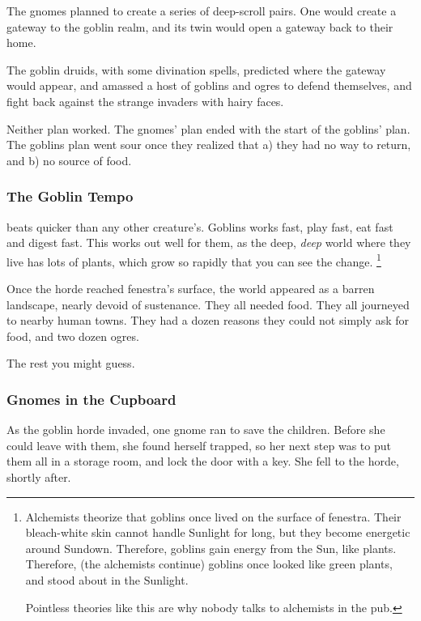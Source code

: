 \begin{multicols}{2}
\begin{exampletext}
  The gnomes planned to create a series of \gls{deep}-scroll pairs.
  One would create a gateway to the goblin realm, and its twin would open a gateway back to their home.

  The goblin druids, with some divination spells, predicted where the gateway would appear, and amassed a host of goblins and ogres to defend themselves, and fight back against the strange invaders with hairy faces. 

  Neither plan worked.
  The gnomes' plan ended with the start of the goblins' plan.
  The goblins plan went sour once they realized that a) they had no way to return, and b) no source of food.

  \subsubsection{The Goblin Tempo}
  beats quicker than any other creature's.
  Goblins works fast, play fast, eat fast and digest fast.
  This works out well for them, as the deep, \emph{deep} world where they live has lots of plants, which grow so rapidly that you can see the change.%
  \footnote{Alchemists theorize that goblins once lived on the surface of \gls{fenestra}.
  Their bleach-white skin cannot handle Sunlight for long, but they become energetic around Sundown.
  Therefore, goblins gain energy from the Sun, like plants.
  Therefore, (the alchemists continue) goblins once looked like green plants, and stood about in the Sunlight.

  Pointless theories like this are why nobody talks to alchemists in the pub.}

  Once the horde reached \gls{fenestra}'s surface, the world appeared as a barren landscape, nearly devoid of sustenance.
  They all needed food.
  They all journeyed to nearby human towns.
  They had a dozen reasons they could not simply ask for food, and two dozen ogres.

  The rest you might guess.

\end{exampletext}


\subsubsection{Gnomes in the Cupboard}
\label{saving_the_children}

\begin{exampletext}
  As the goblin horde invaded, one gnome ran to save the children.
  Before she could leave with them, she found herself trapped, so her next step was to put them all in a storage room, and lock the door with a key.
  She fell to the horde, shortly after.


\end{exampletext}
\end{multicols}
